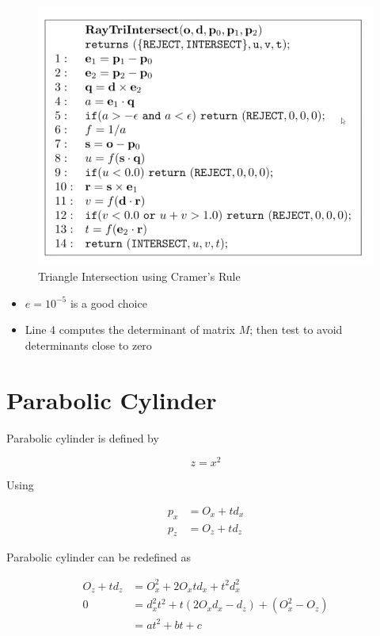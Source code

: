     \begin{figure}[H]
      \centering
      \caption{Triangle Intersection using Cramer's Rule}
      \includegraphics[width=0.7\columnwidth]{images/intersection/triangle-hit-test.png}
    \end{figure}

    \begin{itemize}
      \item $ e = 10^{-5} $ is a good choice
      \item Line 4 computes the determinant of matrix $ M $; then test
      to avoid determinants close to zero
    \end{itemize}

\section{Parabolic Cylinder}

  Parabolic cylinder is defined by

  \begin{equation}
    z = x^{2}
  \end{equation}

  Using

  \begin{align*}
    p_{x} &= O_{x} + t d_{x} \\
    p_{z} &= O_{z} + t d_{z}
  \end{align*}

  Parabolic cylinder can be redefined as

  \begin{align*}
    O_{z} + t d_{z} &= O_{x}^{2} + 2 O_{x} t d_{x} + t^{2} d_{x}^{2} \\
    0 &= d_{x}^{2} t^{2} + t \left( 2 O_{x} d_{x} - d_{z} \right)
      + \left( O_{x}^{2} - O_{z} \right) \\
      &= a t^{2} + bt + c
  \end{align*}

